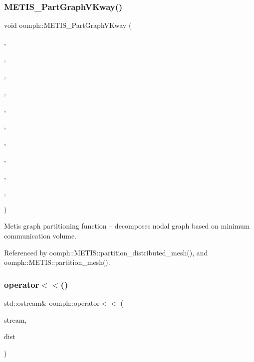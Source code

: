 \mbox{\label{namespaceoomph_abf5fe3c38b4c12aad8fdfd89b05599bd}} 
\subsubsection{\texorpdfstring{M\+E\+T\+I\+S\+\_\+\+Part\+Graph\+V\+Kway()}{METIS\_PartGraphVKway()}}
{\footnotesize\ttfamily void oomph\+::\+M\+E\+T\+I\+S\+\_\+\+Part\+Graph\+V\+Kway (\begin{DoxyParamCaption}\item[{int $\ast$}]{,  }\item[{int $\ast$}]{,  }\item[{int $\ast$}]{,  }\item[{int $\ast$}]{,  }\item[{int $\ast$}]{,  }\item[{int $\ast$}]{,  }\item[{int $\ast$}]{,  }\item[{int $\ast$}]{,  }\item[{int $\ast$}]{,  }\item[{int $\ast$}]{,  }\item[{int $\ast$}]{ }\end{DoxyParamCaption})}



Metis graph partitioning function -- decomposes nodal graph based on minimum communication volume. 



Referenced by oomph\+::\+M\+E\+T\+I\+S\+::partition\+\_\+distributed\+\_\+mesh(), and oomph\+::\+M\+E\+T\+I\+S\+::partition\+\_\+mesh().

\mbox{\label{namespaceoomph_ae2dd50f979be8d64fa52baa82a5a490c}} 
\subsubsection{\texorpdfstring{operator$<$$<$()}{operator<<()}\hspace{0.1cm}{\footnotesize\ttfamily [1/3]}}
{\footnotesize\ttfamily std\+::ostream\& oomph\+::operator$<$$<$ (\begin{DoxyParamCaption}\item[{std\+::ostream \&}]{stream,  }\item[{\hyperlink{classoomph_1_1LinearAlgebraDistribution}{Linear\+Algebra\+Distribution} \&}]{dist }\end{DoxyParamCaption})}



